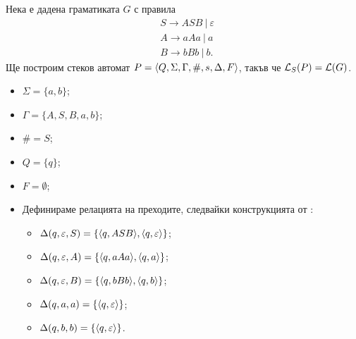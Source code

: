 \begin{example}
  Нека е дадена граматиката $G$ с правила 
  \begin{align*}
    & S \to ASB\ |\ \varepsilon\\
    & A \to aAa\ |\ a\\
    & B \to bBb\ |\ b.
  \end{align*}
  Ще построим стеков автомат $P = \langle{Q,\Sigma,\Gamma,\#,s,\Delta,F}\rangle$, такъв че $\mathcal{L}_S(P) = \mathcal{L}(G)$.
  \begin{itemize}
  \item
    $\Sigma = \{a,b\}$;
  \item 
    $\Gamma = \{A,S,B,a,b\}$;
  \item
    $\# = S$;
  \item
    $Q = \{q\}$;
  \item
    $F = \emptyset$;
  \item
    Дефинираме релацията на преходите, следвайки конструкцията от :
    \begin{itemize}
    \item 
      $\Delta(q,\varepsilon, S) = \{\langle{q,ASB}\rangle, \langle{q,\varepsilon}\rangle\}$;
    \item
      $\Delta(q, \varepsilon, A) = \{\langle{q, aAa}\rangle, \langle{q, a}\rangle\}$;
    \item
      $\Delta(q, \varepsilon, B) = \{\langle{q, bBb}\rangle, \langle{q, b}\rangle\}$;
    \item
      $\Delta(q, a, a) = \{\langle{q,\varepsilon}\rangle\}$;
    \item
      $\Delta(q, b, b) = \{\langle{q,\varepsilon}\rangle\}$.
    \end{itemize}
  \end{itemize}
\end{example}


